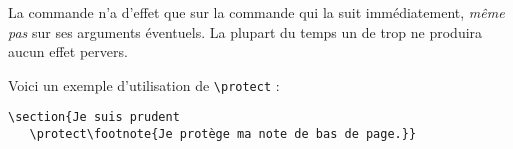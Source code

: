 La commande  n'a d'effet que sur la commande qui la suit
immédiatement, \emph{même pas} sur ses arguments éventuels.
La plupart du temps un  de trop ne produira aucun effet pervers.

Voici un exemple d'utilisation de \verb+\protect+ :
\begin{center}
\begin{verbatim}
\section{Je suis prudent
   \protect\footnote{Je protège ma note de bas de page.}}
\end{verbatim}
\end{center}

\endinput

